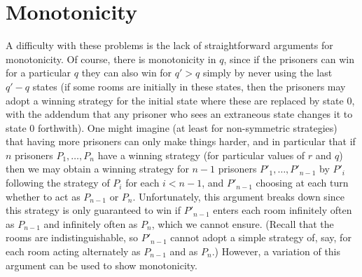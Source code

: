\documentclass[a4paper,11pt]{extarticle}
\theoremstyle{definition}
\theoremstyle{remark}
\begin{document}
	\section{Monotonicity}\label{sec:mono}
	A difficulty with these problems is the lack of straightforward arguments for monotonicity. Of course, there is monotonicity in $q$, since if the prisoners can win for a particular $q$ they can also win for $q'>q$ simply by never using the last $q'-q$ states (if some rooms are initially in these states, then the prisoners may adopt a winning strategy for the initial state where these are replaced by state $0$, with the addendum that any prisoner who sees an extraneous state changes it to state $0$ forthwith). One might imagine (at least for non-symmetric strategies) that having more prisoners can only make things harder, and in particular that if $n$ prisoners $P_1,\ldots, P_n$ have a winning strategy (for particular values of $r$ and $q$) then we may obtain a winning strategy for $n-1$ prisoners $P'_1,\ldots,P'_{n-1}$ by $P'_i$ following the strategy of $P_i$ for each $i<n-1$, and $P'_{n-1}$ choosing at each turn whether to act as $P_{n-1}$ or $P_{n}$. Unfortunately, this argument breaks down since this strategy is only guaranteed to win if $P'_{n-1}$ enters each room infinitely often as $P_{n-1}$ and infinitely often as $P_n$, which we cannot ensure. (Recall that the rooms are indistinguishable, so $P'_{n-1}$ cannot adopt a simple strategy of, say, for each room acting alternately as $P_{n-1}$ and as $P_n$.) However, a variation of this argument can be used to show monotonicity.
	
\end{document}
